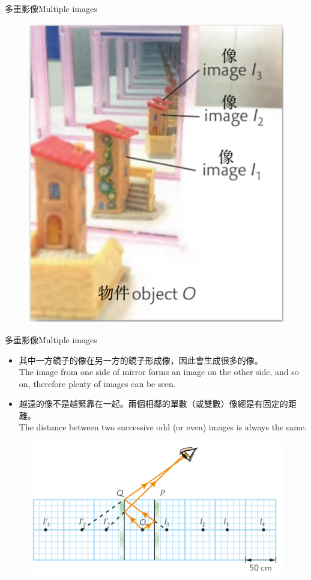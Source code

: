 \documentclass[beamer=true]{standalone}
\begin{document}
\begin{frame}{多重影像Multiple images}
    \begin{figure}
        \centering
        \includegraphics[width=0.5\linewidth]{assets/ddkopdk.png}
    \end{figure}
\end{frame}

\begin{frame}{多重影像Multiple images}
    \begin{itemize}
        \item 其中一方鏡子的像在另一方的鏡子形成像，因此會生成很多的像。\\The image from one side of mirror forms an image on the other side, and so on, therefore plenty of images can be seen.
        \item 越遠的像不是越緊靠在一起。兩個相鄰的單數（或雙數）像總是有固定的距離。\\The distance between two successive odd (or even) images is always the same.
    \end{itemize}
    
    \begin{figure}
        \centering
        \includegraphics[width=0.66\linewidth]{assets/ddqjoij12.png}
        
        
    \end{figure}
\end{frame}
\end{document}
